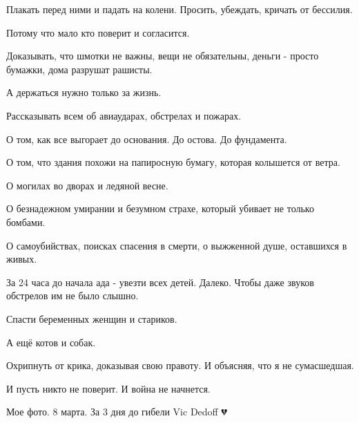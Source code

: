 Плакать перед ними и падать на колени.  Просить,   убеждать, кричать от
бессилия.

Потому что мало кто  поверит и согласится. 

Доказывать, что шмотки не важны, вещи не обязательны,  деньги - просто бумажки,
дома разрушат рашисты. 

А  держаться нужно только  за жизнь. 

Рассказывать всем об авиаударах, обстрелах и пожарах.

О том, как  все выгорает до основания. До остова.  До фундамента.  

О том, что  здания похожи на папиросную бумагу, которая колышется от ветра. 

О могилах во дворах и ледяной весне.  

О безнадежном умирании и безумном страхе, который убивает не только бомбами. 

О самоубийствах, поисках   спасения  в смерти, о выжженной душе,  оставшихся в
живых. 

За 24 часа до начала ада -  увезти всех  детей.  Далеко. Чтобы даже звуков
обстрелов  им не было слышно.  

Спасти беременных женщин и стариков. 

А ещё котов и собак. 

Охрипнуть от крика, доказывая свою правоту.  И объясняя, что я не сумасшедшая. 

И пусть никто не  поверит.  И  война не начнется.

Мое фото. 8 марта. За 3 дня до гибели Vic Dedoff 💔

